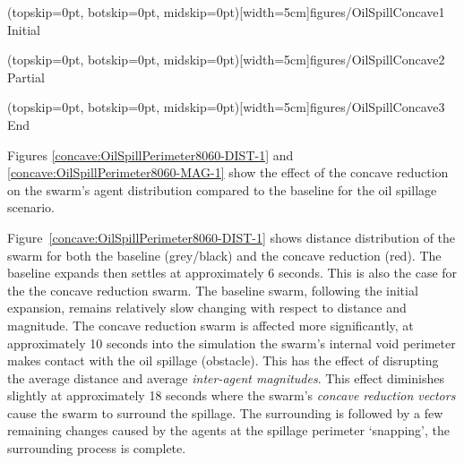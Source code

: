 \documentclass{ieeeaccess}
\begin{document}
\Figure[t!](topskip=0pt, botskip=0pt, midskip=0pt)[width=5cm]{figures/OilSpillConcave1}
{Initial\label{concave:OilSpillConcave1}}


\Figure[t!](topskip=0pt, botskip=0pt, midskip=0pt)[width=5cm]{figures/OilSpillConcave2}
{Partial\label{concave:OilSpillConcave2}}


\Figure[t!](topskip=0pt, botskip=0pt, midskip=0pt)[width=5cm]{figures/OilSpillConcave3}
{End\label{concave:OilSpillConcave3}}


Figures \ref{concave:OilSpillPerimeter8060-DIST-1} and \ref{concave:OilSpillPerimeter8060-MAG-1} show the effect of the concave reduction on the swarm's agent distribution compared to the baseline for the oil spillage scenario. 

Figure~\ref{concave:OilSpillPerimeter8060-DIST-1} shows distance distribution of the swarm for both the baseline (grey/black) and the concave reduction (red). The baseline expands then settles at approximately 6 seconds. This is also the case for the the concave reduction swarm. The baseline swarm, following the initial expansion, remains relatively slow changing with respect to distance and magnitude. The concave reduction swarm is affected more significantly, at approximately 10 seconds into the simulation the swarm's internal void perimeter makes contact with the oil spillage (obstacle). This has the effect of disrupting the average distance and average \textit{inter-agent magnitudes}. This effect diminishes slightly at approximately 18 seconds where the swarm's \textit{concave reduction vectors} cause the swarm to surround the spillage. The surrounding is followed by a few remaining changes caused by the agents at the spillage perimeter `snapping', the surrounding process is complete.
\end{document}

